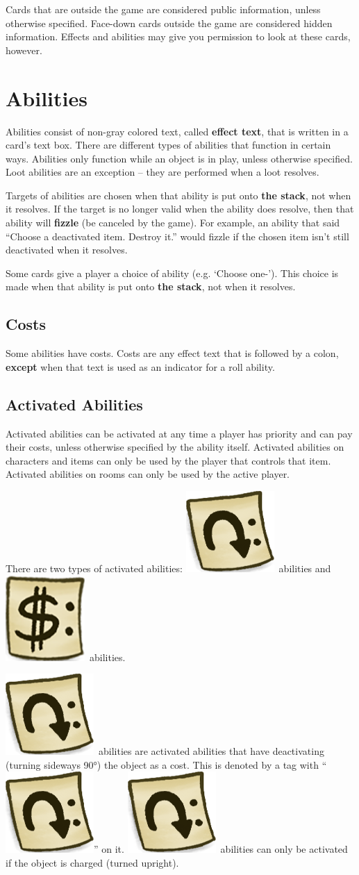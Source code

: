 \documentclass[a4paper, twoside]{report} %
\newcommand{\tap}{\includegraphics[scale=0.1]{./assets/Tag_Tap.png}}
\newcommand{\pay}{\includegraphics[scale=0.1]{./assets/Tag_Paid.png}}
\begin{document}
    Cards that are outside the game are considered public information, unless otherwise specified. Face-down cards outside the game are considered hidden information. Effects and abilities may give you permission to look at these cards, however.

    \chapter{Abilities}
    \label{abilities}
    Abilities consist of non-gray colored text, called \textbf{effect text}, that is written in a card’s text box. There are different types of abilities that function in certain ways. Abilities only function while an object is in play, unless otherwise specified. Loot abilities are an exception – they are performed when a loot resolves.

    Targets of abilities are chosen when that ability is put onto \textbf{the stack}, not when it resolves. If the target is no longer valid when the ability does resolve, then that ability will \textbf{fizzle} (be canceled by the game). For example, an ability that said “Choose a deactivated item. Destroy it.” would fizzle if the chosen item isn’t still deactivated when it resolves.

    Some cards give a player a choice of ability (e.g. ‘Choose one-’). This choice is made when that ability is put onto \textbf{the stack}, not when it resolves.

    \section{Costs}
    Some abilities have costs. Costs are any effect text that is followed by a colon, \textbf{except} when that text is used as an indicator for a roll ability.

    \section{Activated Abilities}
    Activated abilities can be activated at any time a player has priority and can pay their costs, unless otherwise specified by the ability itself. Activated abilities on characters and items can only be used by the player that controls that item. Activated abilities on rooms can only be used by the active player.

    There are two types of activated abilities: \tap\ abilities and \pay\ abilities.
    
    \tap\ abilities are activated abilities that have deactivating (turning sideways 90°) the object as a cost. This is denoted by a tag with “\tap” on it. \tap\ abilities can only be activated if the object is charged (turned upright).
    
\end{document}

